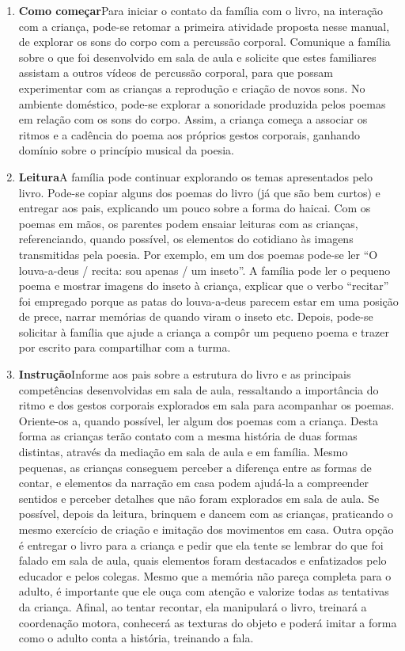 \documentclass[11pt]{extarticle}
\begin{document}
\begin{enumerate}
\item \textbf{Como começar}\quad Para iniciar o contato da família com o livro, na interação com a criança, pode-se retomar a primeira atividade proposta nesse manual, de explorar os sons do corpo com a percussão corporal. Comunique a família sobre o que foi desenvolvido em sala de aula e solicite que estes familiares assistam a outros vídeos de percussão corporal, para que possam experimentar com as crianças a reprodução e criação de novos sons. No ambiente doméstico, pode-se explorar a sonoridade produzida pelos poemas em relação com os sons do corpo. Assim, a criança começa a associar os ritmos e a cadência do poema aos próprios gestos corporais, ganhando domínio sobre o princípio musical da poesia.

\item \textbf{Leitura}\quad A família pode continuar explorando os temas apresentados pelo livro. Pode-se copiar alguns dos poemas do livro (já que são bem curtos) e entregar aos pais, explicando um pouco sobre a forma do haicai. Com os poemas em mãos, os parentes podem ensaiar leituras com as crianças, referenciando, quando possível, os elementos do cotidiano às imagens transmitidas pela poesia. Por exemplo, em um dos poemas pode-se ler ``O louva-a-deus / recita: sou apenas / um inseto''. A família pode ler o pequeno poema e mostrar imagens do inseto à criança, explicar que o verbo ``recitar'' foi empregado porque as patas do louva-a-deus parecem estar em uma posição de prece, narrar memórias de quando viram o inseto etc. Depois, pode-se solicitar à família que ajude a criança a compôr um pequeno poema e trazer por escrito para compartilhar com a turma. 

\item \textbf{Instrução}\quad Informe aos pais sobre a estrutura do livro e as principais competências desenvolvidas em sala de aula, ressaltando a importância do ritmo e dos gestos corporais explorados em sala
para acompanhar os poemas.
Oriente-os a, quando possível, ler algum dos poemas com a criança.
Desta forma as crianças terão contato com a mesma história de duas formas distintas, através da mediação em sala de aula e em família. 
Mesmo pequenas, as crianças conseguem perceber a diferença entre 
as formas de contar, e elementos da narração em casa podem ajudá-la a compreender 
sentidos e perceber detalhes que não foram explorados em sala de aula. Se possível, depois da leitura, brinquem e dancem com as crianças, praticando o mesmo exercício de criação e imitação dos movimentos em casa. 
Outra opção é entregar o livro para a criança e pedir que ela tente se lembrar
do que foi falado em sala de aula, quais elementos foram destacados e enfatizados pelo educador e pelos colegas. Mesmo que a memória não pareça 
completa para o adulto, é importante que ele ouça com atenção e 
valorize todas as tentativas da criança. Afinal, ao tentar recontar, 
ela manipulará o livro, treinará a coordenação motora, conhecerá as texturas 
do objeto e poderá imitar a forma como o adulto 
conta a história, treinando a fala. 
\end{enumerate}
\end{document}
